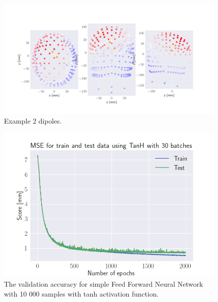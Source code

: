 \documentclass[a4paper, UKenglish, 11pt]{uiomaster}
\begin{document}
\begin{figure}[!htb]
    \centering
    \includegraphics[width=\linewidth]{../Code/plots/finals/eeg_field_2_2.png}
    \caption{Example 2 dipoles. }
    \label{fig:eeg_field_2_dipole_example}
\end{figure}



\begin{figure}[!htb]
    \centering
    \includegraphics[width=\linewidth]{../Code/plots/finals/MSE_**multiple_dipoles_1_noise10_TanH_30_2000.png}
    \caption{The validation accuracy for simple Feed Forward Neural Network with 10 000 samples with tanh activation function. }
    \label{fig:single_dipole_accuracy}
\end{figure}

\end{document}

